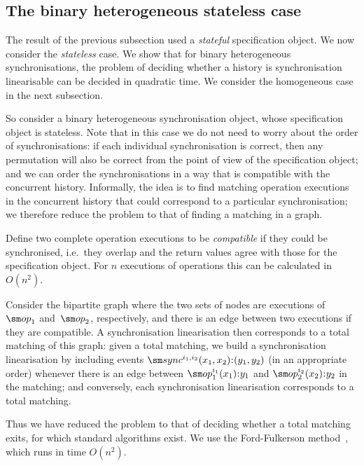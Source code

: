 
\subsection{The binary heterogeneous stateless case}
\label{sec:binary-heterogeneous}

The result of the previous subsection used a \emph{stateful} specification
object.  We now consider the \emph{stateless} case.  We show that for binary
heterogeneous synchronisations, the problem of deciding whether a history is
synchronisation linearisable can be decided in quadratic time.  We consider
the homogeneous case in the next subsection.

So consider a binary heterogeneous synchronisation object, whose specification
object is stateless.  Note that in this case we do not need to worry about the
order of synchronisations: if each individual synchronisation is correct, then
any permutation will also be correct from the point of view of the
specification object; and we can order the synchronisations in a way that is
compatible with the concurrent history.  Informally, the idea is to find
matching operation executions in the concurrent history that could correspond
to a particular synchronisation; we therefore reduce the problem to that of
finding a matching in a graph.

Define two complete operation executions to be \emph{compatible} if they could
be synchronised, i.e.~they overlap and the return values agree with those for
the specification object.  For $n$ executions of operations this can be
calculated in $O(n^2)$.

Consider the bipartite graph where the two sets of nodes are executions
of~$\op_1$ and~$\op_2$, respectively, and there is an edge between two
executions if they are compatible.  A synchronisation linearisation then
corresponds to a total matching of this graph: given a total matching, we
build a synchronisation linearisation by including events
$\sync^{i_1,i_2}(x_1,x_2)\::(y_1,y_2)$ (in an appropriate order) whenever
there is an edge between $\op_1^{i_1}(x_1)\::y_1$ and $\op_2^{i_2}(x_2)\::y_2$
in the matching; and conversely, each synchronisation linearisation
corresponds to a total matching.

Thus we have reduced the problem to that of deciding whether a total matching
exits, for which standard algorithms exist.  We use the Ford-Fulkerson
method~\cite{ford-fulkerson}, which runs in time $O(n^2)$.

